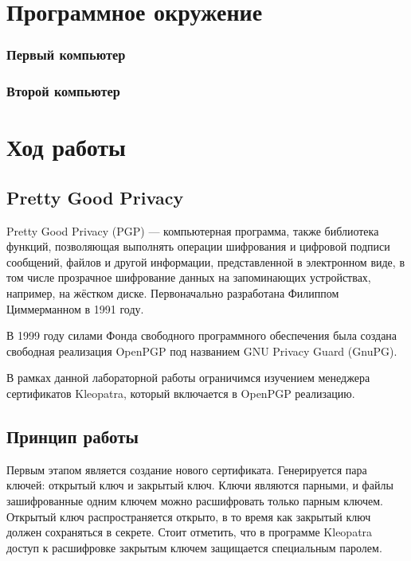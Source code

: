 \documentclass[14pt,a4paper,report]{report}
\begin{document}
\section{Программное окружение}

\subsubsection{Первый компьютер}



\subsubsection{Второй компьютер}



\section{Ход работы}

\subsection{Pretty Good Privacy}

Pretty Good Privacy (PGP) — компьютерная программа, также библиотека функций, позволяющая выполнять операции шифрования и цифровой подписи сообщений, файлов и другой информации, представленной в электронном виде, в том числе прозрачное шифрование данных на запоминающих устройствах, например, на жёстком диске. Первоначально разработана Филиппом Циммерманном в 1991 году.

В 1999 году силами Фонда свободного программного обеспечения была создана свободная реализация OpenPGP под названием GNU Privacy Guard (GnuPG).

В рамках данной лабораторной работы ограничимся изучением менеджера сертификатов Kleopatra, который включается в OpenPGP реализацию.

\subsection{Принцип работы}

Первым этапом является создание нового сертификата. Генерируется пара ключей: открытый ключ и закрытый ключ. Ключи являются парными, и файлы зашифрованные одним ключем можно расшифровать только парным ключем. Открытый ключ распространяется открыто, в то время как закрытый ключ должен сохраняться в секрете. Стоит отметить, что в программе Kleopatra доступ к расшифровке закрытым ключем защищается специальным паролем.
\end{document}
